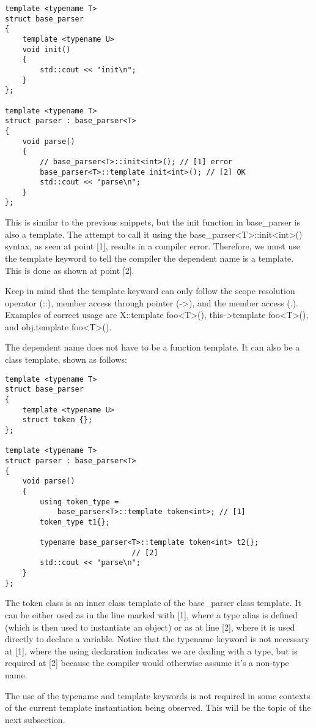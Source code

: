 \begin{lstlisting}[style=styleCXX]
template <typename T>
struct base_parser
{
	template <typename U>
	void init()
	{
		std::cout << "init\n";
	}
};

template <typename T>
struct parser : base_parser<T>
{
	void parse()
	{
		// base_parser<T>::init<int>(); // [1] error
		base_parser<T>::template init<int>(); // [2] OK
		std::cout << "parse\n";
	}
};
\end{lstlisting}

This is similar to the previous snippets, but the init function in base\_parser is also a template. The attempt to call it using the base\_parser<T>::init<int>() syntax, as seen at point [1], results in a compiler error. Therefore, we must use the template keyword to tell the compiler the dependent name is a template. This is done as shown at point [2].

Keep in mind that the template keyword can only follow the scope resolution operator (::), member access through pointer (->), and the member access (.). Examples of correct usage are X::template foo<T>(), this->template foo<T>(), and obj.template foo<T>().

The dependent name does not have to be a function template. It can also be a class template, shown as follows:

\begin{lstlisting}[style=styleCXX]
template <typename T>
struct base_parser
{
	template <typename U>
	struct token {};
};

template <typename T>
struct parser : base_parser<T>
{
	void parse()
	{
		using token_type =
			base_parser<T>::template token<int>; // [1]
		token_type t1{};
		
		typename base_parser<T>::template token<int> t2{};
		                     // [2]
		std::cout << "parse\n";
	}
};
\end{lstlisting}

The token class is an inner class template of the base\_parser class template. It can be either used as in the line marked with [1], where a type alias is defined (which is then used to instantiate an object) or as at line [2], where it is used directly to declare a variable. Notice that the typename keyword is not necessary at [1], where the using declaration indicates we are dealing with a type, but is required at [2] because the compiler would otherwise assume it’s a non-type name.

The use of the typename and template keywords is not required in some contexts of the current template instantiation being observed. This will be the topic of the next subsection.

